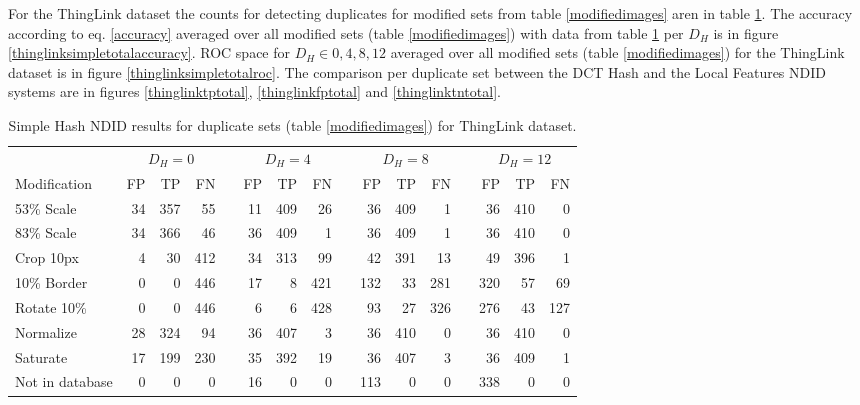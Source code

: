 \documentclass[english,12pt,a4paper,pdftex,elec,utf8]{aaltothesis}
\begin{document}
For the ThingLink dataset the counts for detecting duplicates for modified sets from table \ref{modifiedimages} aren in table \ref{simplethinglinkresults}. The accuracy according to eq. \ref{accuracy} averaged over all modified sets (table \ref{modifiedimages}) with data from table \ref{simplethinglinkresults} per $D_H$ is in figure \ref{thinglinksimpletotalaccuracy}. ROC space for $D_H \in{0,4,8,12}$ averaged over all modified sets (table \ref{modifiedimages}) for the ThingLink dataset is in figure \ref{thinglinksimpletotalroc}. The comparison per duplicate set between the DCT Hash and the Local Features NDID systems are in figures \ref{thinglinktptotal}, \ref{thinglinkfptotal} and \ref{thinglinktntotal}.

\begin{table}[htb]\footnotesize
\caption{ Simple Hash NDID results for duplicate sets (table \ref{modifiedimages}) for ThingLink dataset. }
\label{simplethinglinkresults}
\begin{center}
  \setlength\tabcolsep{3pt} %
  \begin{tabular}{@{}lrrrrrrrrrrrrrrr@{}}
    \toprule
    & \multicolumn{3}{c}{$D_H = 0$} &\phantom{abc} &\multicolumn{3}{c}{$D_H = 4$} &\phantom{abc} & \multicolumn{3}{c}{$D_H=8$} &\phantom{abc} & \multicolumn{3}{c}{$D_H=12$}\\
\cmidrule{2-4} \cmidrule{6-8} \cmidrule{10-12} \cmidrule{14-16}
    Modification & FP & TP & FN &\phantom{abc} & FP & TP & FN &\phantom{abc} & FP & TP & FN &\phantom{abc} & FP & TP & FN\\ \midrule
    53\% Scale   & 34 & 357 & 55 &\phantom{abc} & 11 & 409 & 26 &\phantom{abc} & 36 & 409 & 1 &\phantom{abc} & 36 & 410 & 0\\
    83\% Scale   & 34 & 366 & 46 &\phantom{abc} & 36 & 409 & 1 &\phantom{abc} & 36 & 409 & 1 &\phantom{abc} & 36 & 410 & 0\\
    Crop 10px    & 4 & 30 & 412 &\phantom{abc} & 34 & 313 & 99 &\phantom{abc} & 42 & 391 & 13 &\phantom{abc} & 49 & 396 & 1\\
    10\% Border  & 0 & 0 & 446 & \phantom{abc} & 17 & 8 & 421 &\phantom{abc} & 132 & 33 & 281 &\phantom{abc} & 320 & 57 & 69\\
    Rotate 10\%  & 0 & 0 & 446 &\phantom{abc} & 6 & 6 & 428 &\phantom{abc} & 93 & 27 & 326 &\phantom{abc} & 276 & 43 & 127\\
    Normalize    & 28 & 324 & 94 &\phantom{abc} & 36 & 407 & 3 &\phantom{abc} & 36 & 410 & 0 &\phantom{abc} & 36 & 410 & 0\\
    Saturate     & 17 & 199 & 230 &\phantom{abc} & 35 & 392 & 19 &\phantom{abc} & 36 & 407 & 3 &\phantom{abc} & 36 & 409 & 1\\
    Not in database     & 0& 0& 0 &\phantom{abc} & 16 & 0 & 0 &\phantom{abc} &113 & 0 & 0 &\phantom{abc} & 338 & 0 & 0\\

    \bottomrule
\end{tabular}
\end{center}
\end{table}
\end{document}
